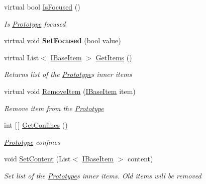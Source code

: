 \begin{DoxyCompactItemize}
\item 
virtual bool \mbox{\hyperlink{class_space_v_i_l_1_1_prototype_aa89bae9f05c9cfce9c1dda5231b3b321}{Is\+Focused}} ()
\begin{DoxyCompactList}\small\item\em Is \mbox{\hyperlink{class_space_v_i_l_1_1_prototype}{Prototype}} focused \end{DoxyCompactList}\item 
\mbox{\label{class_space_v_i_l_1_1_prototype_a26f69bbb1e267956b567aaf6181dc345}} 
virtual void {\bfseries Set\+Focused} (bool value)
\item 
virtual List$<$ \mbox{\hyperlink{interface_space_v_i_l_1_1_core_1_1_i_base_item}{I\+Base\+Item}} $>$ \mbox{\hyperlink{class_space_v_i_l_1_1_prototype_a6d5e123222980d052f762368a17b6826}{Get\+Items}} ()
\begin{DoxyCompactList}\small\item\em Returns list of the \mbox{\hyperlink{class_space_v_i_l_1_1_prototype}{Prototype}}\textquotesingle{}s inner items \end{DoxyCompactList}\item 
virtual void \mbox{\hyperlink{class_space_v_i_l_1_1_prototype_a7a2aabccfe6389f71d0265fa73f0ae87}{Remove\+Item}} (\mbox{\hyperlink{interface_space_v_i_l_1_1_core_1_1_i_base_item}{I\+Base\+Item}} item)
\begin{DoxyCompactList}\small\item\em Remove item from the \mbox{\hyperlink{class_space_v_i_l_1_1_prototype}{Prototype}} \end{DoxyCompactList}\item 
int \mbox{[}$\,$\mbox{]} \mbox{\hyperlink{class_space_v_i_l_1_1_prototype_a5d6fa221e52785b78d1e3cd706a38abb}{Get\+Confines}} ()
\begin{DoxyCompactList}\small\item\em \mbox{\hyperlink{class_space_v_i_l_1_1_prototype}{Prototype}} confines \end{DoxyCompactList}\item 
void \mbox{\hyperlink{class_space_v_i_l_1_1_prototype_aae3089e9f3585ccbf1b5a935cf0c0b27}{Set\+Content}} (List$<$ \mbox{\hyperlink{interface_space_v_i_l_1_1_core_1_1_i_base_item}{I\+Base\+Item}} $>$ content)
\begin{DoxyCompactList}\small\item\em Set list of the \mbox{\hyperlink{class_space_v_i_l_1_1_prototype}{Prototype}}\textquotesingle{}s inner items. Old items will be removed \end{DoxyCompactList}\item 

\end{DoxyCompactItemize}
